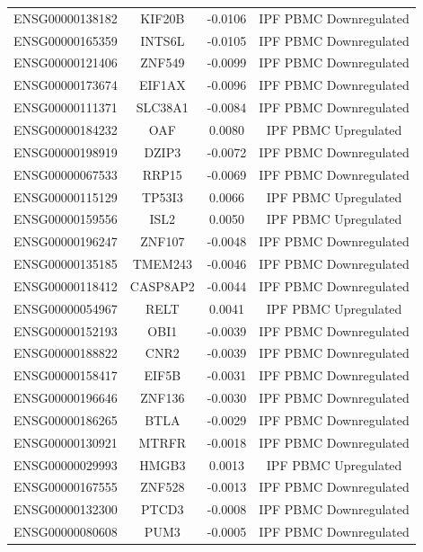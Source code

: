 \documentclass[
]{article}
\begin{document}
\begin{singlespace}
\begin{longtable}[t]{lccc}
ENSG00000138182 & KIF20B & -0.0106 & IPF PBMC Downregulated\\
ENSG00000165359 & INTS6L & -0.0105 & IPF PBMC Downregulated\\
ENSG00000121406 & ZNF549 & -0.0099 & IPF PBMC Downregulated\\
ENSG00000173674 & EIF1AX & -0.0096 & IPF PBMC Downregulated\\
ENSG00000111371 & SLC38A1 & -0.0084 & IPF PBMC Downregulated\\
\addlinespace
ENSG00000184232 & OAF & 0.0080 & IPF PBMC Upregulated\\
ENSG00000198919 & DZIP3 & -0.0072 & IPF PBMC Downregulated\\
ENSG00000067533 & RRP15 & -0.0069 & IPF PBMC Downregulated\\
ENSG00000115129 & TP53I3 & 0.0066 & IPF PBMC Upregulated\\
ENSG00000159556 & ISL2 & 0.0050 & IPF PBMC Upregulated\\
\addlinespace
ENSG00000196247 & ZNF107 & -0.0048 & IPF PBMC Downregulated\\
ENSG00000135185 & TMEM243 & -0.0046 & IPF PBMC Downregulated\\
ENSG00000118412 & CASP8AP2 & -0.0044 & IPF PBMC Downregulated\\
ENSG00000054967 & RELT & 0.0041 & IPF PBMC Upregulated\\
ENSG00000152193 & OBI1 & -0.0039 & IPF PBMC Downregulated\\
\addlinespace
ENSG00000188822 & CNR2 & -0.0039 & IPF PBMC Downregulated\\
ENSG00000158417 & EIF5B & -0.0031 & IPF PBMC Downregulated\\
ENSG00000196646 & ZNF136 & -0.0030 & IPF PBMC Downregulated\\
ENSG00000186265 & BTLA & -0.0029 & IPF PBMC Downregulated\\
ENSG00000130921 & MTRFR & -0.0018 & IPF PBMC Downregulated\\
\addlinespace
ENSG00000029993 & HMGB3 & 0.0013 & IPF PBMC Upregulated\\
ENSG00000167555 & ZNF528 & -0.0013 & IPF PBMC Downregulated\\
ENSG00000132300 & PTCD3 & -0.0008 & IPF PBMC Downregulated\\
ENSG00000080608 & PUM3 & -0.0005 & IPF PBMC Downregulated\\*
\end{longtable}
\endgroup{}




\end{singlespace}
\end{document}
